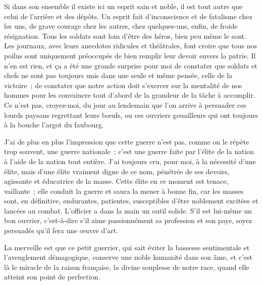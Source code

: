 \documentclass[french,twoside]{book} %
\newenvironment{quoteblock}%
  {\begin{quoting}}
  {\end{quoting}}
\newenvironment{quotebar}{%
    \def\FrameCommand{{\color{rubric!10!}\vrule width 0.5em} \hspace{0.9em}}%
    \def\OuterFrameSep{\itemsep} %
    \MakeFramed {\advance\hsize-\width \FrameRestore}
  }%
  {%
    \endMakeFramed
  }
\renewenvironment{quoteblock}%
  {%
    \savenotes
    \setstretch{0.9}
    \normalfont
    \begin{quotebar}
  }
  {%
    \end{quotebar}
    \spewnotes
  }
\begin{document}
\begin{quoteblock}
 \noindent Si dans son ensemble il existe ici un esprit sain et noble, il est tout autre que celui de l’arrière et des dépôts. Un esprit fait d’inconscience et de fatalisme chez les uns, de grave courage chez les autres, chez quelques-uns, enfin, de froide résignation. Tous les soldats sont loin d’être des héros, bien peu même le sont. Les journaux, avec leurs anecdotes ridicules et théâtrales, font croire que tous nos poilus sont uniquement préoccupés de bien remplir leur devoir envers la patrie. Il n’en est rien, et ça a été une grande surprise pour moi de constater que soldats et chefs ne sont pas toujours unis dans une seule et même pensée, celle de la victoire ; de constater que notre action doit s’exercer sur la mentalité de nos hommes pour les convaincre tout d’abord de la grandeur de la tâche à accomplir. Ce n’est pas, croyez-moi, du jour au lendemain que l’on arrive à persuader ces lourds paysans regrettant leurs bœufs, ou ces ouvriers gouailleurs qui ont toujours à la bouche l’argot du faubourg.‌\par
 J’ai de plus en plus l’impression que cette guerre n’est pas, comme on le répète trop souvent, une guerre nationale ; c’est une guerre faite par l’élite de la nation à l’aide de la nation tout entière. J’ai toujours cru, pour moi, à la nécessité d’une élite, mais d’une élite vraiment digne de ce nom, pénétrée de ses devoirs, agissante et éducatrice de la masse. Cette élite en ce moment est tenace, vaillante ; elle conduit la guerre et saura la mener à bonne fin, car les masses sont, en définitive, endurantes, patientes, susceptibles d’être noblement excitées et lancées au combat. L’officier a dans la main un outil solide. S’il est lui-même un bon ouvrier, c’est-à-dire s’il aime passionnément sa profession et son pays, soyez persuadés qu’il fera une œuvre d’art.‌
 \end{quoteblock}

\noindent La merveille est que ce petit guerrier, qui sait éviter la bassesse sentimentale et l’aveuglement démagogique, conserve une noble humanité dans son âme, et c’est là le miracle de la raison française, la divine souplesse de notre race, quand elle atteint son point de perfection.‌\par
\end{document}

